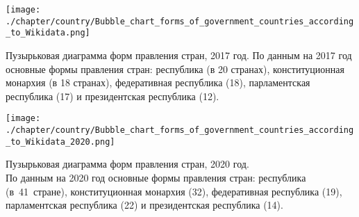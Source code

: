 \begin{fullwidth}
\noindent\begin{minipage}[]{.484\linewidth}
    \centering
	    \texttt{[image: ./chapter/country/Bubble\_chart\_forms\_of\_government\_countries\_according\_to\_Wikidata.png]}
        \caption{Пузырьковая диаграмма форм правления стран, 2017 год. По данным на 2017 год основные формы правления стран: республика (в 20 странах), конституционная монархия (в 18 странах), федеративная республика (18), парламентская республика (17) и президентская республика (12).} 
	    \label{fig:bubble_chart_forms_of_government_countries_2017}%
\end{minipage}%
\hfill
\begin{minipage}[]{.46\linewidth}
    \centering
	\texttt{[image: ./chapter/country/Bubble\_chart\_forms\_of\_government\_countries\_according\_to\_Wikidata\_2020.png]}
    \caption{Пузырьковая диаграмма форм правления стран, 2020 год.
	\\
	По данным на 2020 год  основные формы правления стран: республика (в~41~стране), конституционная монархия (32), федеративная республика (19), парламентская республика (22) и президентская республика (14).} 
	\label{fig:bubble_chart_forms_of_government_countries_2020}%
\end{minipage}
\end{fullwidth}%







